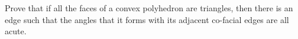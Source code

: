 Prove that if all the faces of a convex polyhedron are triangles,
then there is an edge such that the angles that it forms with its adjacent co-facial edges are all acute.
